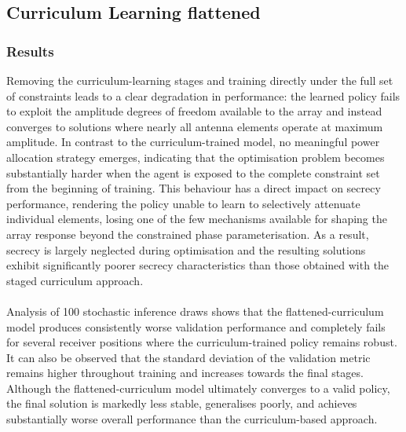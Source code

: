 \subsection{Curriculum Learning flattened}
\label{subsec:curriculum_flattened}
\subsubsection{Results}

Removing the curriculum-learning stages and training directly under the full set of constraints leads to a clear degradation in performance: the learned policy fails to exploit the amplitude degrees of freedom available to the array and instead converges to solutions where nearly all antenna elements operate at maximum amplitude. In contrast to the curriculum-trained model, no meaningful power allocation strategy emerges, indicating that the optimisation problem becomes substantially harder when the agent is exposed to the complete constraint set from the beginning of training. This behaviour has a direct impact on secrecy performance, rendering the policy unable to learn to selectively attenuate individual elements, losing one of the few mechanisms available for shaping the array response beyond the constrained phase parameterisation. As a result, secrecy is largely neglected during optimisation and the resulting solutions exhibit significantly poorer secrecy characteristics than those obtained with the staged curriculum approach.
\\
\\
Analysis of 100 stochastic inference draws shows that the flattened-curriculum model produces consistently worse validation performance and completely fails for several receiver positions where the curriculum-trained policy remains robust. It can also be observed that the standard deviation of the validation metric remains higher throughout training and increases towards the final stages. Although the flattened-curriculum model ultimately converges to a valid policy, the final solution is markedly less stable, generalises poorly, and achieves substantially worse overall performance than the curriculum-based approach.

